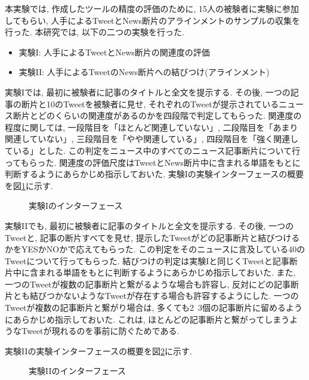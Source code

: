 \documentclass[12pt]{jarticle}
\begin{document}
本実験では, 作成したツールの精度の評価のために, 15人の被験者に実験に参加してもらい, 人手によるTweetとNews断片のアラインメントのサンプルの収集を行った. 
本研究では, 以下の二つの実験を行った. 
\begin{itemize}
  \item 実験I: 人手によるTweetとNews断片の関連度の評価
  \item 実験II: 人手によるTweetのNews断片への結びつけ(アラインメント)
\end{itemize}

実験Iでは, 最初に被験者に記事のタイトルと全文を提示する. 
その後, 一つの記事の断片と10のTweetを被験者に見せ, それぞれのTweetが提示されているニュース断片とどのくらいの関連度があるのかを四段階で判定してもらった. 
関連度の程度に関しては, 
一段階目を「ほとんど関連していない」, 
二段階目を「あまり関連していない」, 
三段階目を「やや関連している」, 
四段階目を「強く関連している」とした. 
この判定をニュース中のすべてのニュース記事断片について行ってもらった. 
関連度の評価尺度はTweetとNews断片中に含まれる単語をもとに判断するようにあらかじめ指示しておいた. 
実験Iの実験インターフェースの概要を図\ref{annotation_by_human_A}に示す. 

\begin{figure}[t]
  \begin{center}
  \end{center}
  \label{annotation_by_human_A}
  \caption{実験Iのインターフェース}
\end{figure}

実験IIでも, 最初に被験者に記事のタイトルと全文を提示する. 
その後, 一つのTweetと, 記事の断片すべてを見せ, 提示したTweetがどの記事断片と結びつけるかをYESかNOかで応えてもらった. 
この判定をそのニュースに言及している40のTweetについて行ってもらった. 
結びつけの判定は実験Iと同じくTweetと記事断片中に含まれる単語をもとに判断するようにあらかじめ指示しておいた. 
また, 一つのTweetが複数の記事断片と繋がるような場合も許容し, 反対にどの記事断片とも結びつかないようなTweetが存在する場合も許容するようにした. 
一つのTweetが複数の記事断片と繋がり場合は, 多くても2~3個の記事断片に留めるようにあらかじめ指示しておいた. 
これは, ほとんどの記事断片と繋がってしまうようなTweetが現れるのを事前に防ぐためである. 

実験IIの実験インターフェースの概要を図\ref{annotation_by_human_B}に示す. 

\begin{figure}[t]
  \begin{center}
  \end{center}
  \label{annotation_by_human_B}
  \caption{実験IIのインターフェース}
\end{figure}
\end{document}
